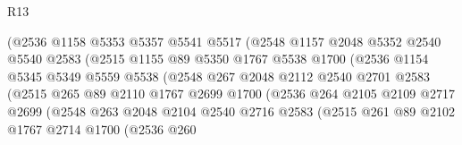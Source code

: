 \begin{lexlean}{R13}
\begin{coremodule}
                          (@2536
                            @1158
                            @5353
                            @5357
                            @5541
                            @5517
                            (@2548
                              @1157
                              @2048
                              @5352
                              @2540
                              @5540
                              @2583
                              (@2515
                                @1155
                                @89
                                @5350
                                @1767
                                @5538
                                @1700
                                (@2536
                                  @1154
                                  @5345
                                  @5349
                                  @5559
                                  @5538
                                  (@2548
                                    @267
                                    @2048
                                    @2112
                                    @2540
                                    @2701
                                    @2583
                                    (@2515
                                      @265
                                      @89
                                      @2110
                                      @1767
                                      @2699
                                      @1700
                                      (@2536
                                        @264
                                        @2105
                                        @2109
                                        @2717
                                        @2699
                                        (@2548
                                          @263
                                          @2048
                                          @2104
                                          @2540
                                          @2716
                                          @2583
                                          (@2515
                                            @261
                                            @89
                                            @2102
                                            @1767
                                            @2714
                                            @1700
                                            (@2536
                                              @260

\end{coremodule}
\end{lexlean}
